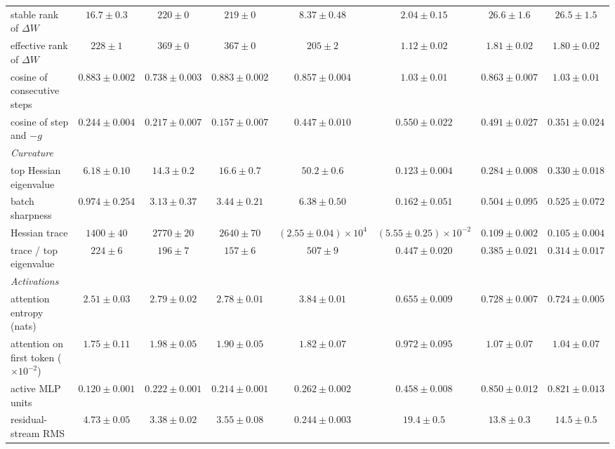 \begin{center}
\begin{minipage}{\linewidth}
{\begin{tabular}{@{}l|cccc|ccc@{}}
stable rank of $\Delta W$ & $16.7 \pm 0.3$ & $220 \pm 0$ & $219 \pm 0$ & $8.37 \pm 0.48$ & $2.04 \pm 0.15$ & {\boldmath\textbf{$26.6 \pm 1.6$}} & {\boldmath\textbf{$26.5 \pm 1.5$}} \\
effective rank of $\Delta W$ & $228 \pm 1$ & $369 \pm 0$ & $367 \pm 0$ & $205 \pm 2$ & $1.12 \pm 0.02$ & $1.81 \pm 0.02$ & $1.80 \pm 0.02$ \\
cosine of consecutive steps & $0.883 \pm 0.002$ & $0.738 \pm 0.003$ & $0.883 \pm 0.002$ & $0.857 \pm 0.004$ & $1.03 \pm 0.01$ & $0.863 \pm 0.007$ & $1.03 \pm 0.01$ \\
cosine of step and $-g$ & $0.244 \pm 0.004$ & $0.217 \pm 0.007$ & $0.157 \pm 0.007$ & $0.447 \pm 0.010$ & $0.550 \pm 0.022$ & $0.491 \pm 0.027$ & $0.351 \pm 0.024$ \\
\emph{Curvature} & & & & & & & \\
top Hessian eigenvalue & $6.18 \pm 0.10$ & $14.3 \pm 0.2$ & $16.6 \pm 0.7$ & $50.2 \pm 0.6$ & {\boldmath\textbf{$0.123 \pm 0.004$}} & $0.284 \pm 0.008$ & $0.330 \pm 0.018$ \\
batch sharpness & $0.974 \pm 0.254$ & $3.13 \pm 0.37$ & $3.44 \pm 0.21$ & $6.38 \pm 0.50$ & {\boldmath\textbf{$0.162 \pm 0.051$}} & $0.504 \pm 0.095$ & $0.525 \pm 0.072$ \\
Hessian trace & $1400 \pm 40$ & $2770 \pm 20$ & $2640 \pm 70$ & $(2.55 \pm 0.04){\times}10^{4}$ & {\boldmath\textbf{$(5.55 \pm 0.25){\times}10^{-2}$}} & {\boldmath\textbf{$0.109 \pm 0.002$}} & {\boldmath\textbf{$0.105 \pm 0.004$}} \\
trace / top eigenvalue & $224 \pm 6$ & $196 \pm 7$ & $157 \pm 6$ & $507 \pm 9$ & $0.447 \pm 0.020$ & $0.385 \pm 0.021$ & $0.314 \pm 0.017$ \\
\emph{Activations} & & & & & & & \\
attention entropy (nats) & $2.51 \pm 0.03$ & $2.79 \pm 0.02$ & $2.78 \pm 0.01$ & $3.84 \pm 0.01$ & $0.655 \pm 0.009$ & $0.728 \pm 0.007$ & $0.724 \pm 0.005$ \\
attention on first token ($\times10^{-2}$) & $1.75 \pm 0.11$ & $1.98 \pm 0.05$ & $1.90 \pm 0.05$ & $1.82 \pm 0.07$ & $0.972 \pm 0.095$ & $1.07 \pm 0.07$ & $1.04 \pm 0.07$ \\
active MLP units & $0.120 \pm 0.001$ & $0.222 \pm 0.001$ & $0.214 \pm 0.001$ & $0.262 \pm 0.002$ & $0.458 \pm 0.008$ & $0.850 \pm 0.012$ & $0.821 \pm 0.013$ \\
residual-stream RMS & $4.73 \pm 0.05$ & $3.38 \pm 0.02$ & $3.55 \pm 0.08$ & $0.244 \pm 0.003$ & {\boldmath\textbf{$19.4 \pm 0.5$}} & {\boldmath\textbf{$13.8 \pm 0.3$}} & {\boldmath\textbf{$14.5 \pm 0.5$}} \\

\end{tabular}}
\end{minipage}
\end{center}
